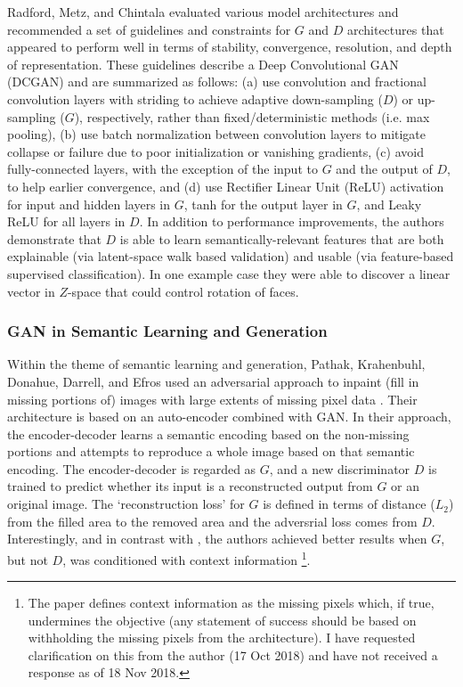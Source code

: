 \documentclass[11pt]{article}
\begin{document}
Radford, Metz, and Chintala \cite{DBLP:journals/corr/RadfordMC15} evaluated various model architectures and recommended a set of guidelines and constraints for $G$ and $D$ architectures that appeared to perform well in terms of stability, convergence, resolution, and depth of representation.  These guidelines describe a Deep Convolutional GAN (DCGAN) and are summarized as follows: (a) use convolution and fractional convolution layers with striding to achieve adaptive down-sampling ($D$) or up-sampling ($G$), respectively, rather than fixed/deterministic methods (i.e. max pooling), (b) use batch normalization between convolution layers to mitigate collapse or failure due to poor initialization or vanishing gradients, (c) avoid fully-connected layers, with the exception of the input to $G$ and the output of $D$, to help earlier convergence, and (d) use Rectifier Linear Unit (ReLU) activation for input and hidden layers in $G$, tanh for the output layer in $G$, and Leaky ReLU for all layers in $D$.  In addition to performance improvements, the authors demonstrate that $D$ is able to learn semantically-relevant features that are both explainable (via latent-space walk based validation) and usable (via feature-based supervised classification).  In one example case they were able to discover a linear vector in $Z$-space that could control rotation of faces.  


\subsubsection{GAN in Semantic Learning and Generation}

Within the theme of semantic learning and generation, Pathak, Krahenbuhl, Donahue, Darrell, and Efros used an adversarial approach to inpaint (fill in missing portions of) images with large extents of missing pixel data \cite{pathakCVPR16context}.  Their architecture is based on an auto-encoder \cite{hinton2006reducing} combined with GAN.  In their approach, the encoder-decoder learns a semantic encoding based on the non-missing portions and attempts to reproduce a whole image based on that semantic encoding.  The encoder-decoder is regarded as $G$, and a new discriminator $D$ is trained to predict whether its input is a reconstructed output from $G$ or an original image.  The `reconstruction loss' for $G$ is defined in terms of distance ($L_2$) from the filled area to the removed area and the adversrial loss comes from $D$. Interestingly, and in contrast with \cite{mirza2014conditional}, the authors achieved better results when $G$, but not $D$, was conditioned with context information \footnote{The paper defines context information as the missing pixels which, if true, undermines the objective (any statement of success should be based on withholding the missing pixels from the architecture).  I have requested clarification on this from the author (17 Oct 2018) and have not received a response as of 18 Nov 2018.}.
\end{document}

